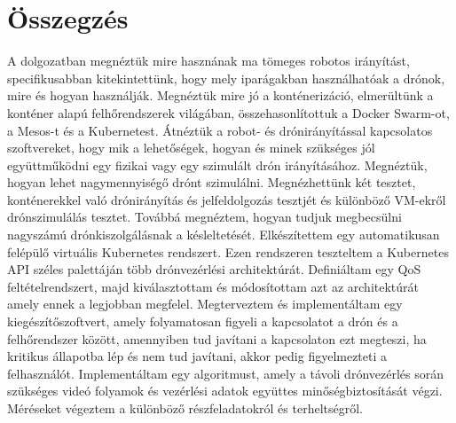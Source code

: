 \chapter*{Összegzés}
A dolgozatban megnéztük mire hasznának ma tömeges robotos irányítást, specifikusabban kitekintettünk, hogy mely iparágakban használhatóak a drónok, mire és hogyan használják. Megnéztük mire jó a konténerizáció, elmerültünk a konténer alapú felhőrendszerek világában, összehasonlítottuk a Docker Swarm-ot, a Mesos-t és a Kubernetest. Átnéztük a robot- és drónirányítással kapcsolatos szoftvereket, hogy mik a lehetőségek, hogyan és minek szükséges jól együttműködni egy fizikai vagy egy szimulált drón irányításához. Megnéztük, hogyan lehet nagymennyiségő drónt szimulálni. Megnézhettünk két tesztet, konténerekkel való drónirányítás és jelfeldolgozás tesztjét és különböző VM-ekről drónszimulálás tesztet. Továbbá megnéztem, hogyan tudjuk megbecsülni nagyszámú drónkiszolgálásnak a késleltetését. Elkészítettem egy automatikusan felépülő virtuális Kubernetes rendszert. Ezen rendszeren teszteltem a Kubernetes API széles palettáján több drónvezérlési architektúrát. Definiáltam egy QoS feltételrendszert, majd kiválasztottam és módosítottam azt az architektúrát amely ennek a legjobban megfelel. Megterveztem és implementáltam egy kiegészítőszoftvert, amely folyamatosan figyeli a kapcsolatot a drón és a felhőrendszer között, amennyiben tud javítani a kapcsolaton ezt megteszi, ha kritikus állapotba lép és nem tud javítani, akkor pedig figyelmezteti a felhasználót. Implementáltam egy algoritmust, amely a távoli drónvezérlés során szükséges videó folyamok és vezérlési adatok együttes minőségbiztosítását végzi. Méréseket végeztem a különböző részfeladatokról és terheltségről.